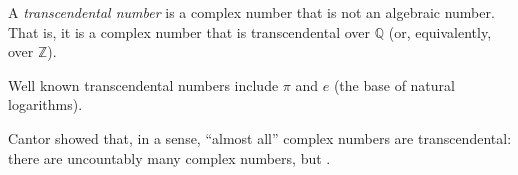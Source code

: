 \documentclass{article}
\def\Q{\mathbb{Q}}
\def\Z{\mathbb{Z}}
\begin{document}
A \emph{transcendental number} is a complex number
that is not an algebraic number.
That is, it is a complex number that is transcendental over $\Q$
(or, equivalently, over $\Z$).

Well known transcendental numbers include $\pi$ and $e$
(the base of natural logarithms).

Cantor showed that, in a sense,
``almost all'' complex numbers are transcendental:
there are uncountably many complex numbers, but
.
\end{document}
